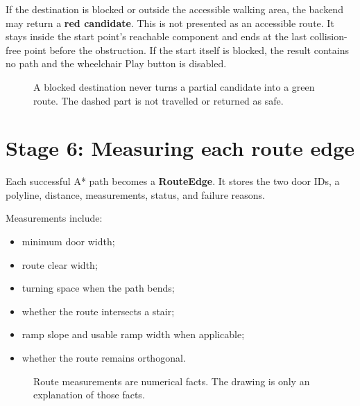 \documentclass[11pt,a4paper]{article}
\newcommand{\term}[1]{\textbf{#1}}
\newcommand{\door}[2]{\fill[green] (#1-0.16,#2-0.32) rectangle (#1+0.16,#2+0.32);}
\begin{document}
If the destination is blocked or outside the accessible walking area, the backend may return a \term{red candidate}. This is not presented as an accessible route. It stays inside the start point's reachable component and ends at the last collision-free point before the obstruction. If the start itself is blocked, the result contains no path and the wheelchair Play button is disabled.

\begin{figure}[H]\centering
{}
\caption{A blocked destination never turns a partial candidate into a green route. The dashed part is not travelled or returned as safe.}
\end{figure}

\section{Stage 6: Measuring each route edge}
Each successful A* path becomes a \term{RouteEdge}. It stores the two door IDs, a polyline, distance, measurements, status, and failure reasons.

Measurements include:
\begin{itemize}
\item minimum door width;
\item route clear width;
\item turning space when the path bends;
\item whether the route intersects a stair;
\item ramp slope and usable ramp width when applicable;
\item whether the route remains orthogonal.
\end{itemize}

\begin{figure}[H]\centering
{}
\caption{Route measurements are numerical facts. The drawing is only an explanation of those facts.}
\end{figure}
\end{document}
